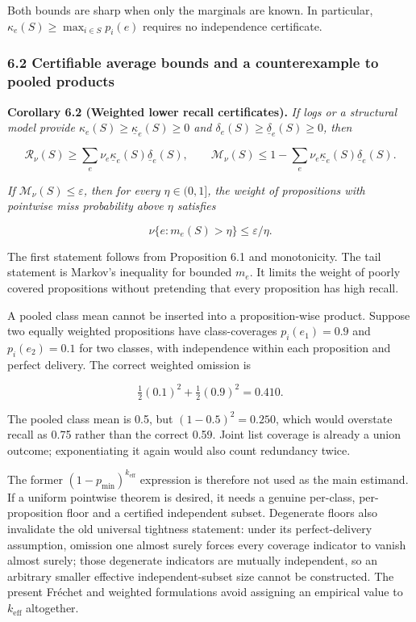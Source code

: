 \documentclass[
  11pt]{article}
\begin{document}
Both bounds are sharp when only the marginals are known. In particular,
\(\kappa_e(S)\ge\max_{i\in S}p_i(e)\) requires no independence
certificate.

\subsubsection{6.2 Certifiable average bounds and a counterexample to
pooled
products}\label{certifiable-average-bounds-and-a-counterexample-to-pooled-products}

\textbf{Corollary 6.2 (Weighted lower recall certificates).} \emph{If
logs or a structural model provide
\(\kappa_e(S)\ge\underline\kappa_e(S)\ge0\) and
\(\delta_e(S)\ge\underline\delta_e(S)\ge0\), then}

\[\mathcal R_\nu(S)\ge\sum_e\nu_e\underline\kappa_e(S)\underline\delta_e(S),\qquad
\mathcal M_\nu(S)\le1-\sum_e\nu_e\underline\kappa_e(S)\underline\delta_e(S).\]

\emph{If \(\mathcal M_\nu(S)\le\varepsilon\), then for every
\(\eta\in(0,1]\), the weight of propositions with pointwise miss
probability above \(\eta\) satisfies}

\[\nu\{e:m_e(S)>\eta\}\le\varepsilon/\eta.\]

The first statement follows from Proposition 6.1 and monotonicity. The
tail statement is Markov's inequality for bounded \(m_e\). It limits the
weight of poorly covered propositions without pretending that every
proposition has high recall.

A pooled class mean cannot be inserted into a proposition-wise product.
Suppose two equally weighted propositions have class-coverages
\(p_i(e_1)=0.9\) and \(p_i(e_2)=0.1\) for two classes, with independence
within each proposition and perfect delivery. The correct weighted
omission is

\[\tfrac12(0.1)^2+\tfrac12(0.9)^2=0.410.\]

The pooled class mean is 0.5, but \((1-0.5)^2=0.250\), which would
overstate recall as 0.75 rather than the correct 0.59. Joint list
coverage is already a union outcome; exponentiating it again would also
count redundancy twice.

The former \((1-p_{\min})^{k_{\mathrm{eff}}}\) expression is therefore
not used as the main estimand. If a uniform pointwise theorem is
desired, it needs a genuine per-class, per-proposition floor and a
certified independent subset. Degenerate floors also invalidate the old
universal tightness statement: under its perfect-delivery assumption,
omission one almost surely forces every coverage indicator to vanish
almost surely; those degenerate indicators are mutually independent, so
an arbitrary smaller effective independent-subset size cannot be
constructed. The present Fréchet and weighted formulations avoid
assigning an empirical value to \(k_{\mathrm{eff}}\) altogether.
\end{document}
